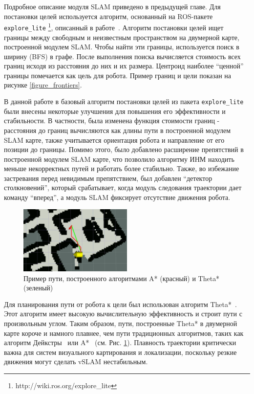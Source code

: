 \documentclass{mipt-thesis-ms}
\begin{document}
	Подробное описание модуля SLAM приведено в предыдущей главе. Для постановки целей используется алгоритм, основанный на ROS-пакете \texttt{explore\_lite} \footnote{http://wiki.ros.org/explore\_lite}, описанный в работе~\cite{Horner2016}. Алгоритм постановки целей ищет границы между свободным и неизвестным пространством на двумерной карте, построенной модулем SLAM. Чтобы найти эти границы, используется поиск в ширину (BFS) в графе. После выполнения поиска вычисляется стоимость всех границ исходя из расстояния до них и их размера. Центроид наиболее ``ценной'' границы помечается как цель для робота. Пример границ и цели показан на рисунке \ref{figure_frontiers}.
	
	В данной работе в базовый алгоритм постановки целей из пакета \texttt{explore\_lite} были внесены некоторые улучшения для повышения его эффективности и стабильности. В частности, была изменена функция стоимости границ - расстояния до границ вычисляются как длины пути в построенной модулем SLAM карте, также учитывается ориентация робота и направление от его позиции до границы. Помимо этого, было добавлено расширение препятствий в построенной модулем SLAM карте, что позволило алгоритму ИНМ находить меньше некорректных путей и работать более стабильно. Также, во избежание застревания перед невидимым препятствием, был добавлен ``детектор столкновений'', который срабатывает, когда модуль следования траектории дает команду ``вперед'', а модуль SLAM фиксирует отсутствие движения робота.
	
	\begin{figure}
		\centering
		\includegraphics[width=0.5\textwidth]{img/paths_truncated.png}
		\caption{Пример пути, построенного алгоритмами A* (красный) и Theta* (зеленый) }
		\label{figure_thetastar_path}
	\end{figure}
	
	Для планирования пути от робота к цели был использован алгоритм Theta*~\cite{nash2007theta}. Этот алгоритм имеет высокую вычислительную эффективность и строит пути с произвольным углом. Таким образом, пути, построенные Theta* в двумерной карте короче и намного плавнее, чем пути традиционных алгоритмов, таких как алгоритм Дейкстры~\cite{dijkstra1959note} или A*~\cite{hart1968formal} (см. Рис. \ref{figure_thetastar_path}). Плавность траектории критически важна для систем визуального картирования и локализации, поскольку резкие движения могут сделать vSLAM нестабильным.
	
\end{document}
